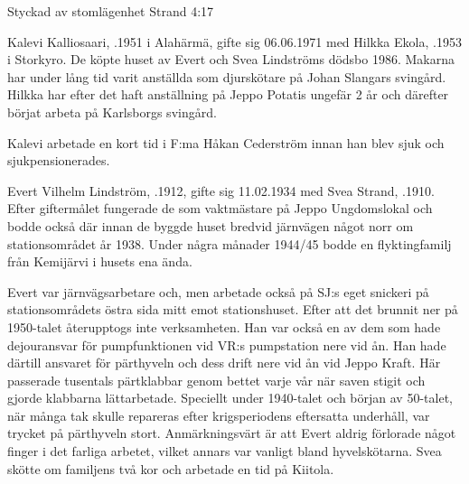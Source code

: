 Styckad av stomlägenhet Strand 4:17


Kalevi Kalliosaari, .1951 i Alahärmä, gifte sig 06.06.1971 med Hilkka Ekola, .1953 i Storkyro. De köpte huset av Evert och Svea Lindströms dödsbo 1986. Makarna har under lång tid varit anställda som djurskötare på Johan Slangars svingård. Hilkka har efter det haft anställning på Jeppo Potatis ungefär 2 år och därefter börjat arbeta på Karlsborgs svingård.

Kalevi arbetade en kort tid i F:ma Håkan Cederström innan han blev sjuk och sjukpensionerades.
\begin{jhchildren}
  \item {}
  \item {}
  \item {}
\end{jhchildren}


Evert Vilhelm Lindström, .1912, gifte sig 11.02.1934 med Svea Strand, .1910. Efter giftermålet fungerade de som vaktmästare på Jeppo Ungdomslokal och bodde också där innan de byggde huset bredvid järnvägen något norr om stationsområdet år 1938. Under några månader 1944/45 bodde en flyktingfamilj från Kemijärvi i husets ena ända.

Evert var järnvägsarbetare och, men arbetade också på SJ:s eget snickeri på stationsområdets östra sida mitt emot stationshuset. Efter att det brunnit ner på 1950-talet återupptogs inte verksamheten. Han var också en av dem som hade dejouransvar för pumpfunktionen vid VR:s pumpstation nere vid ån. Han hade därtill ansvaret för pärthyveln och dess drift nere vid ån vid Jeppo Kraft. Här passerade tusentals pärtklabbar genom bettet varje vår när saven stigit och gjorde klabbarna lättarbetade. Speciellt under 1940-talet och början av 50-talet, när många tak skulle repareras efter krigsperiodens eftersatta underhåll, var trycket på pärthyveln stort. Anmärkningsvärt är att Evert aldrig förlorade något finger i det farliga arbetet, vilket annars var vanligt bland hyvelskötarna. Svea skötte om familjens två kor och  arbetade en tid på Kiitola.
\begin{jhchildren}
  \item {}
  \item {}
\end{jhchildren}

